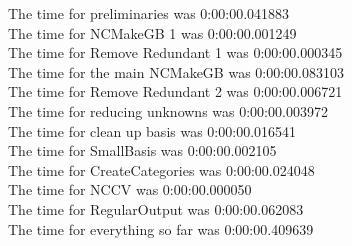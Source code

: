 \documentclass[rep10,leqno]{report}
\begin{document}
\noindent
The time for preliminaries was 0:00:00.041883\\
The time for NCMakeGB 1 was 0:00:00.001249\\
The time for Remove Redundant 1 was 0:00:00.000345\\
The time for the main NCMakeGB was 0:00:00.083103\\
The time for Remove Redundant 2 was 0:00:00.006721\\
The time for reducing unknowns was 0:00:00.003972\\
The time for clean up basis was 0:00:00.016541\\
The time for SmallBasis was 0:00:00.002105\\
The time for CreateCategories was 0:00:00.024048\\
The time for NCCV was 0:00:00.000050\\
The time for RegularOutput was 0:00:00.062083\\
The time for everything so far was 0:00:00.409639\\
\end{document}

